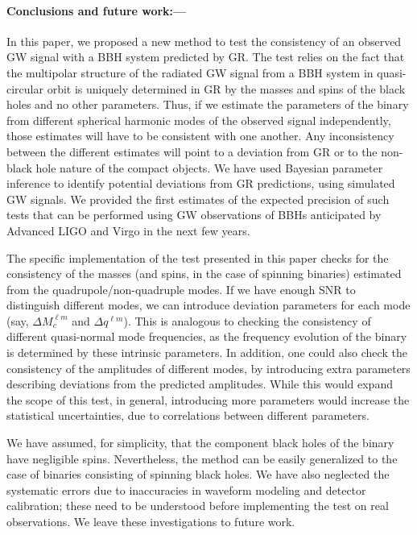 \documentclass[prl,preprintnumbers,twocolumn,eqsecnum,floatfix,a4paper,nofootinbib,superscriptaddress]{revtex4}
\begin{document}
\paragraph{Conclusions and future work:---} In this paper, we proposed a new method to test the consistency of an observed GW signal with a BBH system predicted by GR. The test relies on the fact that the multipolar structure of the radiated GW signal from a BBH system in quasi-circular orbit is uniquely determined in GR by the masses and spins of the black holes and no other parameters. Thus, if we estimate the parameters of the binary from different spherical harmonic modes of the observed signal independently, those estimates will have to be consistent with one another. Any inconsistency between the different estimates will point to a deviation from GR or to the non-black hole nature of the compact objects. We have used Bayesian parameter inference to identify potential deviations from GR predictions, using simulated GW signals.  We provided the first estimates of the expected precision of such tests that can be performed using GW observations of BBHs anticipated by Advanced LIGO and Virgo in the next few years. 

The specific implementation of the test presented in this paper checks for the consistency of the masses (and spins, in the case of spinning binaries) estimated from the quadrupole/non-quadruple modes. If we have enough SNR to distinguish different modes, we can introduce deviation parameters for each mode (say, $\Delta M_c^{\ell m}$ and $\Delta q^{\ell m}$). This is analogous to checking the consistency of different quasi-normal mode frequencies, as the frequency evolution of the binary is determined by these intrinsic parameters. In addition, one could also check the consistency of the amplitudes of different modes, by introducing extra parameters describing deviations from the predicted amplitudes. While this would expand the scope of this test, in general, introducing more parameters would increase the statistical uncertainties, due to correlations between different parameters. 

We have assumed, for simplicity, that the component black holes of the binary have negligible spins. Nevertheless, the method can be easily generalized to the case of binaries consisting of spinning black holes. We have also neglected the systematic errors due to inaccuracies in waveform modeling and detector calibration; these need to be understood before implementing the test on real observations. We leave these investigations to future work. 
\end{document}
